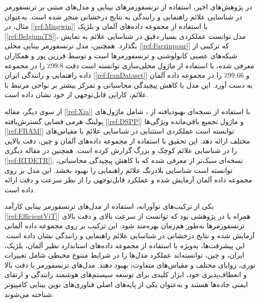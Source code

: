 در پژوهش‌های اخیر، استفاده از ترنسفورمرهای بینایی و مدل‌های مبتنی بر ترنسفورمر در شناسایی علائم راهنمایی و رانندگی به نتایج درخشانی منجر شده است. به‌عنوان مثال، در [\ref{ref:Mingwin}] با استفاده از مجموعه داده‌های آلمان و بلژیک [\ref{ref:BelgiumTS}]، مدل توانست عملکردی بسیار دقیق در شناسایی علائم به نمایش بگذارد. همچنین، مدل ترنسفورمر بینایی محلی [\ref{ref:Farzinpour}] که ترکیبی از شبکه‌های عصبی کانولوشنی و ترنسفورمرها است و توسط فرزین پور و همکاران معرفی شده، با استفاده از ماژول محلی‌سازی توانسته است دقت 99.8٪ را در مجموعه داده راهنمایی و رانندگی ایران [\ref{ref:IranDataset}] و 99.66٪ را در مجموعه داده آلمان به دست آورد. این مدل با کاهش پیچیدگی محاسباتی و تمرکز بیشتر بر نواحی مرتبط با علائم، کارایی قابل‌توجهی از خود نشان داده است.

از سوی دیگر، مقاله [\ref{ref:Xia}] با استفاده از نسخه‌ای بهبودیافته از ، شامل ماژول‌های پولینگ هرمی فضایی گسترش‌یافته [\ref{ref:DSPP}] و ماژول تجمیع باقی‌مانده ویژگی‌ها [\ref{ref:FRAM}] توانسته است عملکردی استثنایی در شناسایی علائم با مقیاس‌های مختلف ارائه دهد. این تحقیق با استفاده از مجموعه داده‌های آلمان و چین، دقت بالایی را در شناسایی علائم کوچک و بزرگ گزارش کرده است. همچنین در مقاله دیگری [\ref{ref:RTDETR}], نسخه‌ای سبک‌تر از  معرفی شده که با کاهش پیچیدگی محاسباتی، توانسته است شناسایی بلادرنگ علائم راهنمایی را بهبود بخشد. این مدل بر روی مجموعه داده آلمان آزمایش شده و عملکرد قابل‌توجهی را از نظر سرعت و دقت ارائه داده است.

یکی از ترکیب‌های نوآورانه، استفاده از مدل‌های ترنسفورمر بینایی کارآمد [\ref{ref:EfficientViT}] همراه با  در پژوهشی بود که توانست از سرعت بالای  و دقت بالای ترنسفورمرها به‌طور هم‌زمان بهره‌مند شود. این ترکیب بر روی مجموعه داده آلمانی آزمایش شده و نتایج درخشانی در شناسایی علائم راهنمایی و رانندگی نشان داده است. این پیشرفت‌ها، به‌ویژه با استفاده از مجموعه داده‌های استاندارد نظیر آلمان، بلژیک، ایران، و چین، توانسته‌اند عملکرد مدل‌ها را در شرایط متنوع محیطی شامل تغییرات نوری، زوایای مختلف و مقیاس‌های متفاوت، بهبود دهند. مدل‌های ترنسفورمر با دقت بالا و انعطاف‌پذیری خود، ابزار کلیدی برای توسعه سیستم‌های هوشمند رانندگی و ارتقای ایمنی جاده‌ها هستند و به‌عنوان یکی از پایه‌های اصلی فناوری‌های نوین بینایی کامپیوتر شناخته می‌شوند.





